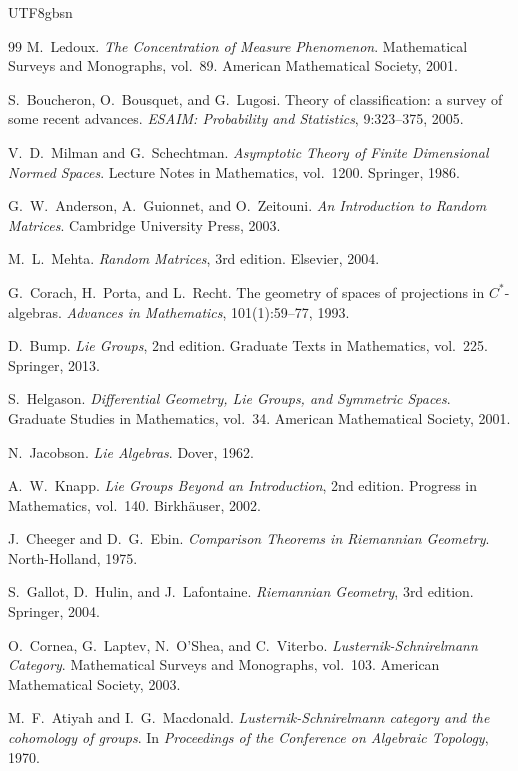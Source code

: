 \documentclass[12pt,a4paper]{article}
\theoremstyle{plain}
\theoremstyle{definition}
\theoremstyle{remark}
\begin{document}
\begin{CJK}{UTF8}{gbsn}
\begin{thebibliography}{99}
M.~Ledoux. \textit{The Concentration of Measure Phenomenon}. Mathematical Surveys and Monographs, vol.~89. American Mathematical Society, 2001.

S.~Boucheron, O.~Bousquet, and G.~Lugosi. Theory of classification: a survey of some recent advances. \textit{ESAIM: Probability and Statistics}, 9:323--375, 2005.

V.~D.~Milman and G.~Schechtman. \textit{Asymptotic Theory of Finite Dimensional Normed Spaces}. Lecture Notes in Mathematics, vol.~1200. Springer, 1986.

G.~W.~Anderson, A.~Guionnet, and O.~Zeitouni. \textit{An Introduction to Random Matrices}. Cambridge University Press, 2003.

M.~L.~Mehta. \textit{Random Matrices}, 3rd edition. Elsevier, 2004.

G.~Corach, H.~Porta, and L.~Recht. The geometry of spaces of projections in $C^*$-algebras. \textit{Advances in Mathematics}, 101(1):59--77, 1993.

D.~Bump. \textit{Lie Groups}, 2nd edition. Graduate Texts in Mathematics, vol.~225. Springer, 2013.

S.~Helgason. \textit{Differential Geometry, Lie Groups, and Symmetric Spaces}. Graduate Studies in Mathematics, vol.~34. American Mathematical Society, 2001.

N.~Jacobson. \textit{Lie Algebras}. Dover, 1962.

A.~W.~Knapp. \textit{Lie Groups Beyond an Introduction}, 2nd edition. Progress in Mathematics, vol.~140. Birkh\"auser, 2002.

J.~Cheeger and D.~G.~Ebin. \textit{Comparison Theorems in Riemannian Geometry}. North-Holland, 1975.

S.~Gallot, D.~Hulin, and J.~Lafontaine. \textit{Riemannian Geometry}, 3rd edition. Springer, 2004.

O.~Cornea, G.~Laptev, N.~O'Shea, and C.~Viterbo. \textit{Lusternik-Schnirelmann Category}. Mathematical Surveys and Monographs, vol.~103. American Mathematical Society, 2003.

M.~F.~Atiyah and I.~G.~Macdonald. \textit{Lusternik-Schnirelmann category and the cohomology of groups}. In \textit{Proceedings of the Conference on Algebraic Topology}, 1970.

\end{thebibliography}

\end{CJK}
\end{document}
